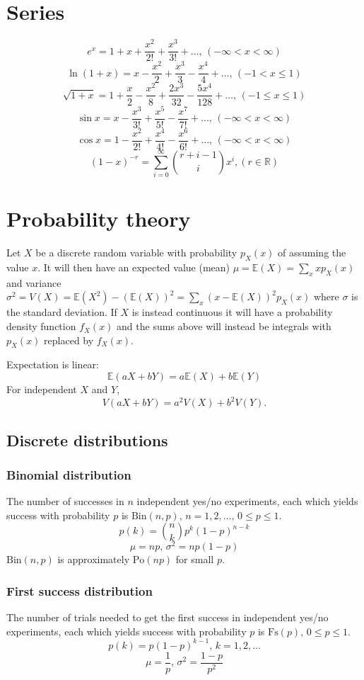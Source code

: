 \section{Series}
{\small
$$e^x = 1+x+\frac{x^2}{2!}+\frac{x^3}{3!}+\dots,\,(-\infty<x<\infty)$$
$$\ln(1+x) = x-\frac{x^2}{2}+\frac{x^3}{3}-\frac{x^4}{4}+\dots,\,(-1<x\leq1)$$
$$\sqrt{1+x} = 1+\frac{x}{2}-\frac{x^2}{8}+\frac{2x^3}{32}-\frac{5x^4}{128}+\dots,\,(-1\leq x\leq1)$$
$$\sin x = x-\frac{x^3}{3!}+\frac{x^5}{5!}-\frac{x^7}{7!}+\dots,\,(-\infty<x<\infty)$$
$$\cos x = 1-\frac{x^2}{2!}+\frac{x^4}{4!}-\frac{x^6}{6!}+\dots,\,(-\infty<x<\infty)$$
$$(1-x)^{-r} = \sum_{i = 0}^{\infty} \binom{r + i - 1}{i}x^i, (r \in \mathbb{R})$$
}

\section{Probability theory}
Let $X$ be a discrete random variable with probability $p_X(x)$ of assuming the value $x$. It will then have an expected value (mean) $\mu=\mathbb{E}(X)=\sum_xxp_X(x)$ and variance $\sigma^2=V(X)=\mathbb{E}(X^2)-(\mathbb{E}(X))^2=\sum_x(x-\mathbb{E}(X))^2p_X(x)$ where $\sigma$ is the standard deviation. If $X$ is instead continuous it will have a probability density function $f_X(x)$ and the sums above will instead be integrals with $p_X(x)$ replaced by $f_X(x)$.

Expectation is linear:
\[\mathbb{E}(aX+bY) = a\mathbb{E}(X)+b\mathbb{E}(Y)\]
For independent $X$ and $Y$, \[V(aX+bY) = a^2V(X)+b^2V(Y).\]

\subsection{Discrete distributions}

\subsubsection{Binomial distribution}
The number of successes in $n$ independent yes/no experiments, each which yields success with probability $p$ is $\textrm{Bin}(n,p),\,n=1,2,\dots,\, 0\leq p\leq1$.
\[p(k)=\binom{n}{k}p^k(1-p)^{n-k}\]
\[\mu = np,\,\sigma^2=np(1-p)\]
$\textrm{Bin}(n,p)$ is approximately $\textrm{Po}(np)$ for small $p$.

\subsubsection{First success distribution}
The number of trials needed to get the first success in independent yes/no experiments, each which yields success with probability $p$ is $\textrm{Fs}(p),\,0\leq p\leq1$.
\[p(k)=p(1-p)^{k-1},\,k=1,2,\dots\]
\[\mu = \frac1p,\,\sigma^2=\frac{1-p}{p^2}\]

